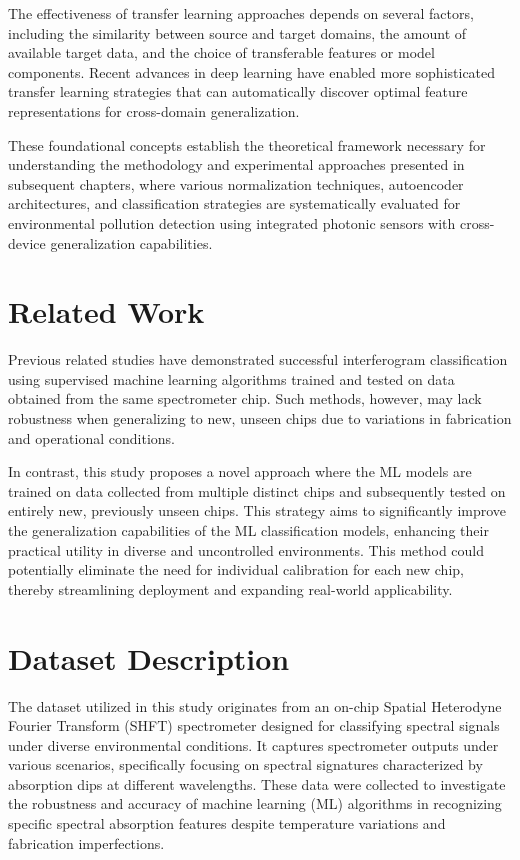 The effectiveness of transfer learning approaches depends on several factors, including the similarity between source and target domains, the amount of available target data, and the choice of
transferable features or model components. Recent advances in deep learning have enabled more sophisticated transfer learning strategies that can automatically discover optimal feature
representations for cross-domain generalization.

These foundational concepts establish the theoretical framework necessary for understanding the methodology and experimental approaches presented in subsequent chapters, where various
normalization techniques, autoencoder architectures, and classification strategies are systematically evaluated for environmental pollution detection using integrated photonic sensors with
cross-device generalization capabilities.

\section{Related Work}

Previous related studies have demonstrated successful interferogram classification using supervised machine learning algorithms trained and tested on data obtained from the same spectrometer chip. Such methods, however, may lack robustness when generalizing to new, unseen chips due to variations in fabrication and operational conditions.\cite{strathprints70439}

In contrast, this study proposes a novel approach where the ML models are trained on data collected from multiple distinct chips and subsequently tested on entirely new, previously unseen chips. This strategy aims to significantly improve the generalization capabilities of the ML classification models, enhancing their practical utility in diverse and uncontrolled environments. This method could potentially eliminate the need for individual calibration for each new chip, thereby streamlining deployment and expanding real-world applicability.

\section{Dataset Description}

The dataset utilized in this study originates from an on-chip Spatial Heterodyne {Fourier Transform} (SHFT) spectrometer designed for classifying spectral signals under diverse environmental conditions. It captures spectrometer outputs under various scenarios, specifically focusing on spectral signatures characterized by absorption dips at different wavelengths. These data were collected to investigate the robustness and accuracy of machine learning (ML) algorithms in recognizing specific spectral absorption features despite temperature variations and fabrication imperfections.

